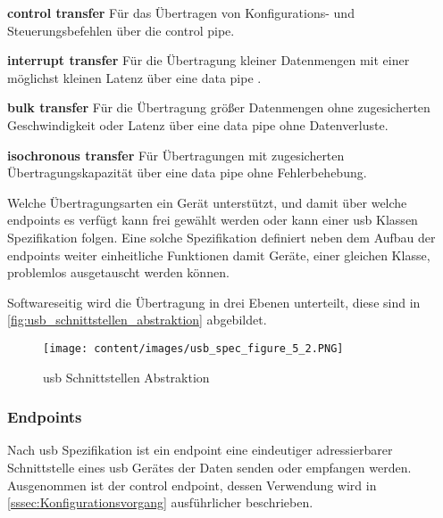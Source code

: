 \begin{compactitem}
    \item \textbf{control transfer} Für das Übertragen von Konfigurations- und Steuerungsbefehlen über die control pipe.
    \item \textbf{interrupt transfer} Für die Übertragung kleiner Datenmengen mit einer möglichst kleinen Latenz über eine data pipe .
    \item \textbf{bulk transfer} Für die Übertragung grö{\ss}er Datenmengen ohne zugesicherten Geschwindigkeit oder Latenz über eine data pipe ohne Datenverluste.
    \item \textbf{isochronous transfer}  Für Übertragungen mit zugesicherten Übertragungskapazität über eine data pipe ohne Fehlerbehebung.
\end{compactitem}
Welche Übertragungsarten ein Gerät unterstützt, und damit über welche endpoints es verfügt kann frei gewählt werden oder kann einer \acrshort{usb} Klassen Spezifikation folgen. Eine solche Spezifikation definiert neben dem Aufbau der endpoints weiter einheitliche Funktionen damit Geräte, einer gleichen Klasse, problemlos ausgetauscht werden können. %

Softwareseitig wird die Übertragung in drei Ebenen unterteilt, diese sind in \autoref{fig:usb_schnittstellen_abstraktion} abgebildet.
\begin{figure}[h]
    \centering
    \texttt{[image: content/images/usb\_spec\_figure\_5\_2.PNG]}
    \caption{\acrshort{usb} Schnittstellen Abstraktion \cite[Figure~5-2]{usb_developer_guide}}
    \label{fig:usb_schnittstellen_abstraktion}
\end{figure}



\subsubsection{Endpoints} \label{sssec:endpoints}
Nach  \acrshort{usb} Spezifikation ist ein endpoint eine eindeutiger adressierbarer Schnittstelle eines \acrshort{usb} Gerätes der Daten senden oder empfangen werden. Ausgenommen ist der control endpoint, dessen Verwendung wird in \autoref{sssec:Konfigurationsvorgang} ausführlicher beschrieben.


